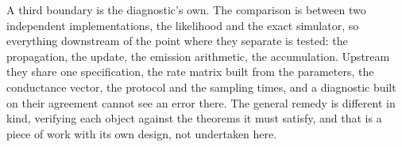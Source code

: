 A third boundary is the diagnostic's own. The comparison is between two independent implementations, the likelihood and the exact simulator, so everything downstream of the point where they separate is tested: the propagation, the update, the emission arithmetic, the accumulation. Upstream they share one specification, the rate matrix built from the parameters, the conductance vector, the protocol and the sampling times, and a diagnostic built on their agreement cannot see an error there. The general remedy is different in kind, verifying each object against the theorems it must satisfy, and that is a piece of work with its own design, not undertaken here.

